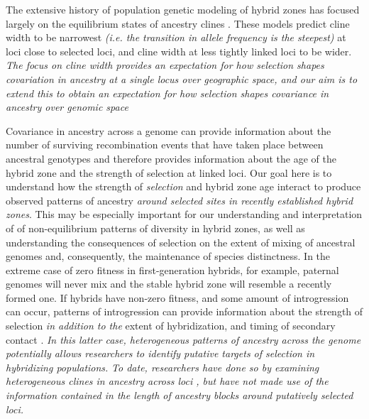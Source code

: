 \documentclass[12pt]{article}
\newcommand{\yb}[1]{{\em \color{magenta} #1}}
\begin{document}
The extensive history of population genetic modeling of hybrid zones has focused largely on the equilibrium states of ancestry clines \cite{Barton1979a,Barton1986}.  
These models predict cline width to be narrowest \yb{(i.e. the transition in allele frequency is the steepest)} at loci close to selected loci, and cline width at less tightly linked loci to be wider. %
\yb{The focus on cline width provides an expectation for how selection shapes covariation in ancestry at a single locus over \emph{geographic space}, and our aim is to extend this to obtain an expectation for how selection shapes covariance in ancestry over \emph{genomic space}}


Covariance in ancestry across a genome can provide information about the number of surviving recombination events that have taken place between ancestral genotypes and therefore provides information about the age of the hybrid zone and the strength of selection at linked loci. 
Our goal here is  to understand how the strength of \yb{selection} and hybrid zone age interact to produce observed patterns of ancestry \yb{around selected sites in recently established hybrid zones}. %
This may be especially important for our understanding and interpretation of of non-equilibrium patterns of diversity in hybrid zones, as well as understanding the consequences of selection on the extent of mixing of ancestral genomes and, consequently, the maintenance of species distinctness. 
In the extreme case of zero fitness in first-generation hybrids, for example, paternal genomes will never mix and the stable hybrid zone will resemble a recently formed one. 
If hybrids have non-zero fitness, and some amount of introgression can occur, patterns of introgression can provide information about the strength of selection \yb{in addition to the} extent of hybridization, and timing of secondary contact \citep{Price2009, Hellenthal2014}. 
\yb{In this latter case, heterogeneous patterns of ancestry across the genome potentially allows researchers to identify putative targets of selection in hybridizing populations.}  
\yb{To date, researchers have done so by examining heterogeneous clines in ancestry across loci \citep{Porter1997, Gompert2012}, but have not made use of the information contained in the length of ancestry blocks around putatively selected loci.}  
\end{document}
